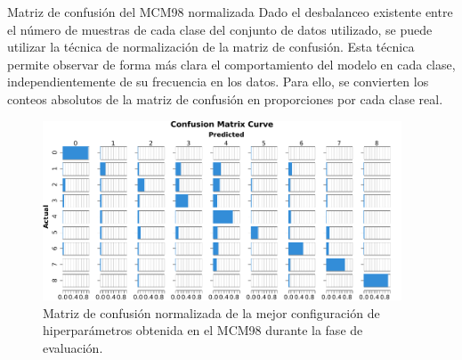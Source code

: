 \begin{frame}{Matriz de confusión del MCM98 normalizada}
Dado el desbalanceo existente entre el número de muestras de cada clase del conjunto de datos utilizado, se puede utilizar la técnica de normalización de la matriz de confusión. Esta técnica permite observar de forma más clara el comportamiento del modelo en cada clase, independientemente de su frecuencia en los datos. Para ello, se convierten los conteos absolutos de la matriz de confusión en proporciones por cada clase real.


\begin{figure}[H]
    \centering
    \includegraphics[width=0.95\textwidth]{../Memoria/img/evaluacion/matrices_confusion/MCNorm_EVAL_MCM98.pdf}
    \caption{Matriz de confusión normalizada de la mejor configuración de hiperparámetros obtenida en el MCM98 durante la fase de evaluación.}
    \label{fig:MCNorm_EVAL_MCM98}
\end{figure}

\end{frame}


